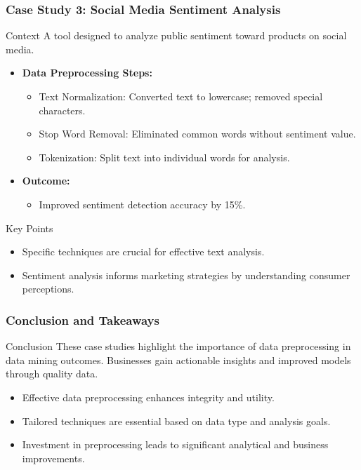 \documentclass[aspectratio=169]{beamer}
\begin{document}
\begin{frame}[fragile]
    \frametitle{Case Study 3: Social Media Sentiment Analysis}
    \begin{block}{Context}
        A tool designed to analyze public sentiment toward products on social media.
    \end{block}
    
    \begin{itemize}
        \item \textbf{Data Preprocessing Steps:}
        \begin{itemize}
            \item Text Normalization: Converted text to lowercase; removed special characters.
            \item Stop Word Removal: Eliminated common words without sentiment value.
            \item Tokenization: Split text into individual words for analysis.
        \end{itemize}
        \item \textbf{Outcome:}
        \begin{itemize}
            \item Improved sentiment detection accuracy by 15\%.
        \end{itemize}
    \end{itemize}
    
    \begin{block}{Key Points}
        \begin{itemize}
            \item Specific techniques are crucial for effective text analysis.
            \item Sentiment analysis informs marketing strategies by understanding consumer perceptions.
        \end{itemize}
    \end{block}
\end{frame}

\begin{frame}[fragile]
    \frametitle{Conclusion and Takeaways}
    \begin{block}{Conclusion}
        These case studies highlight the importance of data preprocessing in data mining outcomes. Businesses gain actionable insights and improved models through quality data.
    \end{block}
    
    \begin{itemize}
        \item Effective data preprocessing enhances integrity and utility.
        \item Tailored techniques are essential based on data type and analysis goals.
        \item Investment in preprocessing leads to significant analytical and business improvements.
    \end{itemize}
\end{frame}
\end{document}
